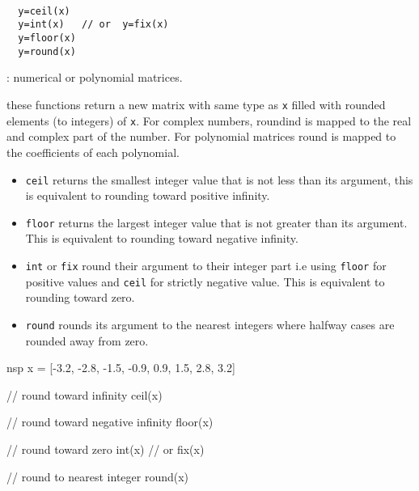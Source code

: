 \begin{mandesc} 
   \\
  \\
   \\
\end{mandesc}
\begin{calling_sequence}
\begin{verbatim}
  y=ceil(x)  
  y=int(x)   // or  y=fix(x)
  y=floor(x)  
  y=round(x)  
\end{verbatim}
\end{calling_sequence}
\begin{parameters}
  \begin{varlist}
    : numerical or polynomial matrices.
  \end{varlist}
\end{parameters}
\begin{mandescription}
  these functions return a new matrix with same type as \verb!x! filled 
  with rounded elements (to integers) of \verb!x!. For complex numbers, roundind is mapped to the 
  real and complex part of the number. For polynomial matrices round is 
  mapped to the  coefficients of each polynomial.
  \begin{itemize}
  \item \verb!ceil! returns the smallest integer value that is not less than its
    argument, this is equivalent to rounding toward positive infinity.
  \item \verb!floor! returns the largest integer value that is not greater than
    its argument. This is equivalent to rounding toward negative infinity.
  \item \verb!int! or \verb!fix! round their argument to their integer part i.e using \verb!floor! for 
    positive values and \verb!ceil! for strictly negative value. This is equivalent to rounding toward zero.
  \item \verb!round! rounds its argument to the nearest integers where halfway cases are rounded
    away from zero.
  \end{itemize}
\end{mandescription}

\begin{examples}
  \begin{mintednsp}{nsp}
x = [-3.2, -2.8, -1.5, -0.9, 0.9, 1.5, 2.8, 3.2]

// round toward infinity
ceil(x)

// round toward negative infinity
floor(x)

// round toward zero
int(x) // or fix(x)

// round to nearest integer
round(x)   
  \end{mintednsp}
\end{examples}
